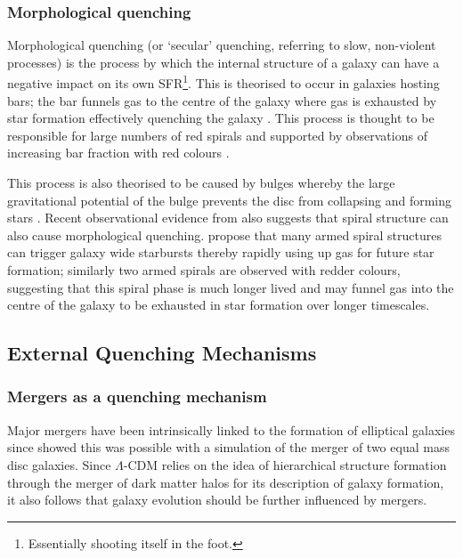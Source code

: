  
\subsubsection{Morphological quenching}\label{sec:moprhquench}

Morphological quenching (or `secular' quenching, referring to slow, non-violent processes) is the process by which the internal structure of a galaxy can have a negative impact on its own SFR\footnote{Essentially shooting itself in the foot.}. This is theorised to occur in galaxies hosting bars; the bar funnels gas to the centre of the galaxy \citep{athanassoula92a} where gas is exhausted by star formation effectively quenching the galaxy \citep{zurita04, sheth05}. This process is thought to be responsible for large numbers of red spirals and supported by observations of increasing bar fraction with red colours \citep{masters11a}. 

This process is also theorised to be caused by bulges \citep{bluck14} whereby the large gravitational potential of the bulge prevents the disc from collapsing and forming stars \citep{Fang13}. Recent observational evidence from \cite{hart16} also suggests that spiral structure can also cause morphological quenching. \citeauthor{hart16} propose that many armed spiral structures can trigger galaxy wide starbursts thereby rapidly using up gas for future star formation; similarly two armed spirals are observed with redder colours, suggesting that this spiral phase is much longer lived and may funnel gas into the centre of the galaxy to be exhausted in star formation over longer timescales.  
  
\subsection{External Quenching Mechanisms}\label{sec:extquench}
  
\subsubsection{Mergers as a quenching mechanism}\label{sec:mergersquench}

Major mergers have been intrinsically linked to the formation of elliptical galaxies since \citet{toomre72} showed this was possible with a simulation of the merger of two equal mass disc galaxies. Since $\Lambda$-CDM relies on the idea of hierarchical structure formation through the merger of dark matter halos for its description of galaxy formation, it also follows that galaxy evolution should be further influenced by mergers. 

